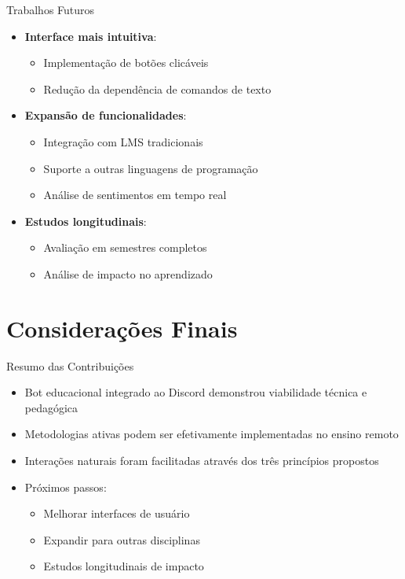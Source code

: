 \documentclass[aspectratio=169]{beamer}
\begin{document}
{\begin{frame}{Trabalhos Futuros}
  \begin{itemize}
  \item \textbf{Interface mais intuitiva}:
    \begin{itemize}
    \item Implementação de botões clicáveis
    \item Redução da dependência de comandos de texto
    \end{itemize}
  \item \textbf{Expansão de funcionalidades}:
    \begin{itemize}
    \item Integração com LMS tradicionais
    \item Suporte a outras linguagens de programação
    \item Análise de sentimentos em tempo real
    \end{itemize}
  \item \textbf{Estudos longitudinais}:
    \begin{itemize}
    \item Avaliação em semestres completos
    \item Análise de impacto no aprendizado
    \end{itemize}
  \end{itemize}
\end{frame}

\section*{Considerações Finais}

\begin{frame}{Resumo das Contribuições}
  \begin{itemize}
  \item
    \alert{Bot educacional} integrado ao Discord demonstrou viabilidade técnica e pedagógica
  \item
    \alert{Metodologias ativas} podem ser efetivamente implementadas no ensino remoto
  \item
    \alert{Interações naturais} foram facilitadas através dos três princípios propostos
  \end{itemize}
  
  \begin{itemize}
  \item
    Próximos passos:
    \begin{itemize}
    \item
      Melhorar interfaces de usuário
    \item
      Expandir para outras disciplinas
    \item
      Estudos longitudinais de impacto
    \end{itemize}
  \end{itemize}
\end{frame}

}
\end{document}

